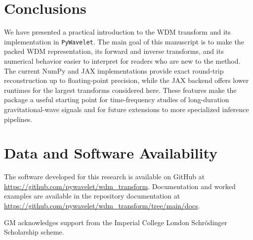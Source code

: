 \documentclass[%
 reprint,
superscriptaddress,
nofootinbib,
 amsmath,amssymb,
 aps,
colorlinks = true, 
linkcolor = blue, 
urlcolor = blue, 
citecolor = blue, 
anchorcolor = blue,
]{revtex4-2}
\newcommand{\package}{\texttt{PyWavelet}}
\begin{document}
\section{Conclusions}
We have presented a practical introduction to the WDM transform and its implementation in \package. The main goal of this manuscript is to make the packed WDM representation, its forward and inverse transforms, and its numerical behavior easier to interpret for readers who are new to the method. The current NumPy and JAX implementations provide exact round-trip reconstruction up to floating-point precision, while the JAX backend offers lower runtimes for the largest transforms considered here. These features make the package a useful starting point for time-frequency studies of long-duration gravitational-wave signals and for future extensions to more specialized inference pipelines.




\section*{Data and Software Availability}
The software developed for this research is available on GitHub at \url{https://github.com/pywavelet/wdm_transform}. Documentation and worked examples are available in the repository documentation at \url{https://github.com/pywavelet/wdm_transform/tree/main/docs}.





\begin{acknowledgments}
GM acknowledges support from the Imperial College London Schr\"odinger Scholarship scheme.
\end{acknowledgments}


\end{document}
